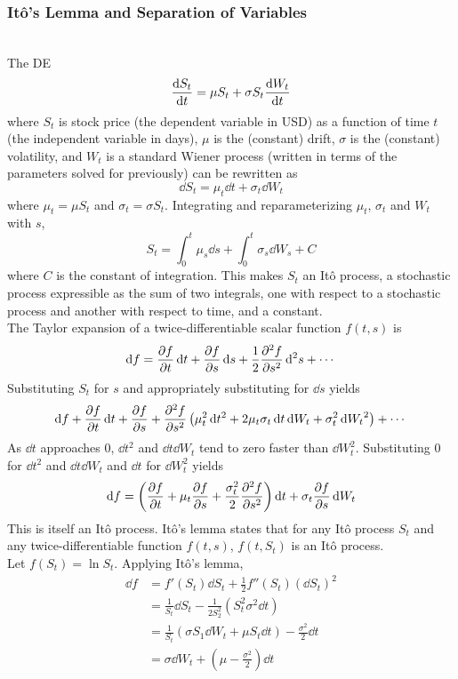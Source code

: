 \documentclass[12pt, A4]{report}
\begin{document}
		\subsubsection*{It\^o's Lemma and Separation of Variables}
		\noindent \\ The DE 
			\[\dv{S_t}{t} = \mu S_t + \sigma S_t\dv{W_t}{t}\]
			where \(S_t\) is stock price (the dependent variable in USD) as a function of time \(t\) (the independent variable in days), \(\mu\) is the (constant) drift, \(\sigma\) is the (constant) volatility, and \(W_t\) is a standard Wiener process (written in terms of the parameters solved for previously) can be rewritten as
			\[\dd{S}_t = \mu_t\dd{t} + \sigma_t\dd{W_t}\]
			where \(\mu_t = \mu S_t\) and \(\sigma_t = \sigma S_t\). Integrating and reparameterizing \(\mu_t\), \(\sigma_t\) and \(W_t\) with \(s\),
			\[S_t = \int_0^t\mu_s\dd{s} + \int_0^t\sigma_s\dd{W}_s + C\]
			where \(C\) is the constant of integration. This makes \(S_t\) an It\^o process, a stochastic process expressible as the sum of two integrals, one with respect to a stochastic process and another with respect to time, and a constant. \\
		The Taylor expansion of a twice-differentiable scalar function \(f(t, s)\) is
			\[\dd{f} = \pdv{f}{t}\dd{t} + \pdv{f}{s}\dd{s} + \frac{1}{2}\pdv[2]{f}{s}\dd[2]{s} + \cdots\]
			Substituting \(S_t\) for \(s\) and appropriately substituting for \(\dd{s}\) yields
			\[\dd{f} + \pdv{f}{t}\dd{t} + \pdv{f}{s} (\mu_t\dd{t} + \sigma_t\dd{W_t}) + \pdv[2]{f}{s}\left(\mu_t^2\dd{t^2} + 2\mu_t\sigma_t\dd{t}\dd{W_t} + \sigma_t^2\dd{W_t}^2\right) + \cdots\]
			As \(\dd{t}\) approaches 0, \(\dd{t}^2\) and \(\dd{t}\dd{W_t}\) tend to zero faster than \(\dd{W_t^2}\). Substituting 0 for \(\dd{t^2}\) and \(\dd{t}\dd{W_t}\) and \(\dd{t}\) for \(\dd{W_t^2}\) yields
			\[\dd{f} = \left(\pdv{f}{t} + \mu_t\pdv{f}{s} + \frac{\sigma_t^2}{2}\pdv[2]{f}{s}\right)\dd{t} + \sigma_t\pdv{f}{s}\dd{W_t}\]
			This is itself an It\^o process. It\^o's lemma states that for any It\^o process \(S_t\) and any twice-differentiable function \(f(t, s)\), \(f(t, S_t)\) is an It\^o process. \\
		Let \(f(S_t) = \ln S_t\). Applying It\^o's lemma,
			\begin{align*}
				\dd{f} &= f'(S_t)\dd{S_t} + \frac{1}{2}f''(S_t)(\dd{S_t})^2 \\
					&= \frac{1}{S_t}\dd{S_t} - \frac{1}{2S_2^2}\left(S_t^2\sigma^2\dd{t}\right) \\
					&= \frac{1}{S_t}(\sigma S_1 \dd{W_t} + \mu S_t \dd{t}) - \frac{\sigma^2}{2}\dd{t} \\
					&= \sigma \dd{W_t} + \left(\mu - \frac{\sigma^2}{2}\right)\dd{t}
			\end{align*}
\end{document}

